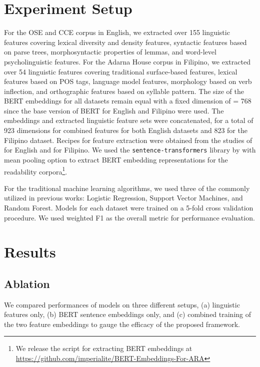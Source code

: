 \documentclass[11pt,a4paper]{article}
\begin{document}
\section{Experiment Setup}
For the OSE and CCE corpus in English, we extracted over 155 linguistic features covering lexical diversity and density features, syntactic features based on parse trees, morphosyntactic properties of lemmas, and word-level psycholinguistic features. For the Adarna House corpus in Filipino, we extracted over 54 linguistic features covering traditional surface-based features, lexical features based on POS tags, language model features, morphology based on verb inflection, and orthographic features based on syllable pattern. The size of the BERT embeddings for all datasets remain equal with a fixed dimension of  = 768 since the base version of BERT for English \cite{devlin-etal-2019-bert} and Filipino \cite{localization2020cruz,establishing2020cruz,evaluating2019cruz} were used. The embeddings and extracted linguistic feature sets were concatenated, for a total of 923 dimensions for combined features for both English datasets and 823 for the Filipino dataset. Recipes for feature extraction were obtained from the studies of \citet{vajjalaM16,vajjala2014ReadabilityAF} for English and \citet{imperial2020exploring,imperial2021application,imperialASimple2021} for Filipino. We used the \texttt{sentence-transformers} library by \citet{reimers-2019-sentence-bert} with mean pooling option to extract BERT embedding representations for the readability corpora\footnote{We release the script for extracting BERT embeddings at \url{https://github.com/imperialite/BERT-Embeddings-For-ARA}}.

For the traditional machine learning algorithms, we used three of the commonly utilized in previous works: Logistic Regression, Support Vector Machines, and Random Forest. Models for each dataset were trained on a 5-fold cross validation procedure. We used weighted F1 as the overall metric for performance evaluation.


\section{Results}

\subsection{Ablation}
We compared performances of models on three different setups, (a) linguistic features only, (b) BERT sentence embeddings only, and (c) combined training of the two feature embeddings to gauge the efficacy of the proposed framework. 
\end{document}
